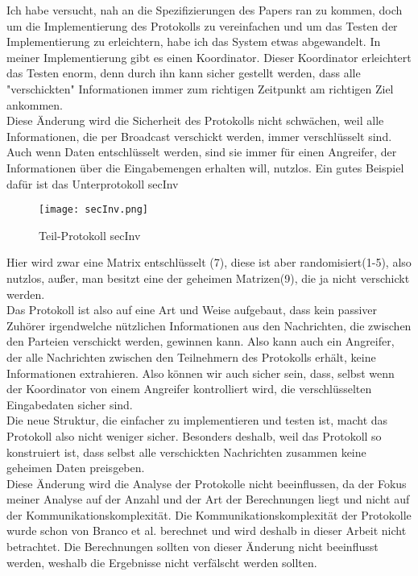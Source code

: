 Ich habe versucht, nah an die Spezifizierungen des Papers ran zu kommen, doch 
um die Implementierung des Protokolls zu vereinfachen und um das Testen der Implementierung zu erleichtern, habe ich das System etwas abgewandelt. In meiner Implementierung gibt es einen Koordinator. Dieser Koordinator erleichtert das Testen enorm, denn durch ihn kann sicher gestellt werden, dass alle "verschickten" Informationen immer zum richtigen Zeitpunkt am richtigen Ziel ankommen.\\
Diese Änderung wird die Sicherheit des Protokolls nicht schwächen, weil alle Informationen, die per Broadcast verschickt werden, immer verschlüsselt sind.
Auch wenn Daten entschlüsselt werden, sind sie immer für einen Angreifer, der Informationen über die Eingabemengen erhalten will, nutzlos. Ein gutes Beispiel dafür ist das Unterprotokoll secInv \\

\begin{figure}[h]
\begin{center}
\texttt{[image: secInv.png]}
\caption{Teil-Protokoll secInv}
\cite{Doettling2021}
\label{oInv}
\end{center}

\end{figure}

Hier wird zwar eine Matrix entschlüsselt (7), diese ist aber randomisiert(1-5), also nutzlos, außer, man besitzt eine der geheimen Matrizen(9), die ja nicht verschickt werden.\\
Das Protokoll ist also auf eine Art und Weise aufgebaut, dass kein passiver Zuhörer irgendwelche nützlichen Informationen aus den Nachrichten, die zwischen den Parteien verschickt werden, gewinnen kann. Also kann auch ein Angreifer, der alle Nachrichten zwischen den Teilnehmern des Protokolls erhält, keine Informationen extrahieren. Also können wir auch sicher sein, dass, selbst wenn der Koordinator von einem Angreifer kontrolliert wird, die verschlüsselten Eingabedaten sicher sind.\\
Die neue Struktur, die einfacher zu implementieren und testen ist, macht das Protokoll also nicht weniger sicher. Besonders deshalb, weil das Protokoll so konstruiert ist, dass selbst alle verschickten Nachrichten zusammen keine geheimen Daten preisgeben.\\
Diese Änderung wird die Analyse der Protokolle nicht beeinflussen, da der Fokus meiner Analyse auf der Anzahl und der Art der Berechnungen liegt und nicht auf der Kommunikationskomplexität. Die Kommunikationskomplexität der Protokolle wurde schon von Branco et al. berechnet und wird deshalb in dieser Arbeit nicht betrachtet. Die Berechnungen sollten von dieser Änderung nicht beeinflusst werden, weshalb die Ergebnisse nicht verfälscht werden sollten.

